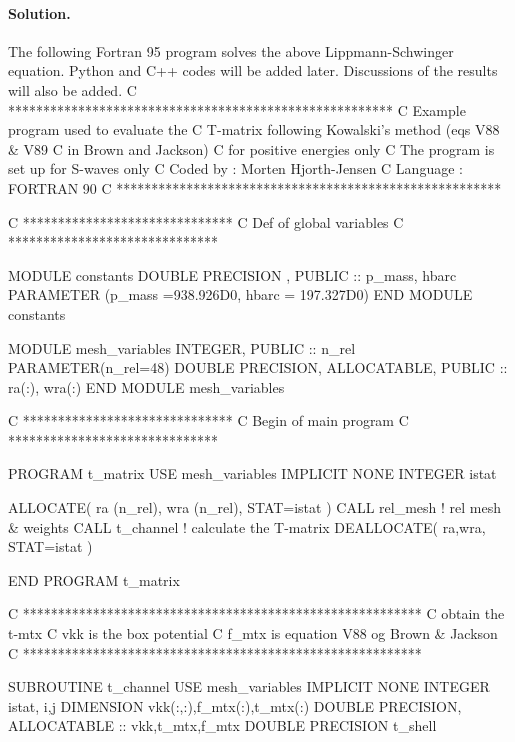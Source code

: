 \documentclass[%
oneside,                 %
final,                   %
10pt]{article}
\newenvironment{doconceexercise}{}{}
\begin{document}
\begin{doconceexercise}
\paragraph{Solution.}
The following Fortran 95 program solves the above Lippmann-Schwinger equation. Python and C++ codes will be added later. Discussions of the results will also be added.  
\bfcod
C     *******************************************************
C         Example program used to evaluate the 
C         T-matrix following Kowalski's method (eqs V88 & V89
C         in Brown and Jackson)  
C         for positive energies only
C         The program is set up for S-waves only
C         Coded by : Morten Hjorth-Jensen
C         Language : FORTRAN 90
C     *******************************************************



C               ******************************
C                 Def of global variables
C               ******************************


      MODULE constants
         DOUBLE PRECISION , PUBLIC :: p_mass, hbarc
         PARAMETER (p_mass =938.926D0, hbarc = 197.327D0)
      END MODULE constants

      MODULE mesh_variables           
         INTEGER, PUBLIC :: n_rel
         PARAMETER(n_rel=48)
         DOUBLE PRECISION, ALLOCATABLE, PUBLIC :: ra(:), wra(:)
      END MODULE  mesh_variables


C               ******************************
C                   Begin of main program
C               ******************************


      PROGRAM t_matrix
      USE mesh_variables
      IMPLICIT NONE
      INTEGER istat

      ALLOCATE( ra (n_rel), wra (n_rel),  STAT=istat )
      CALL rel_mesh               ! rel mesh & weights
      CALL t_channel              ! calculate the T-matrix
      DEALLOCATE( ra,wra, STAT=istat )

      END PROGRAM t_matrix

C     *********************************************************
C                    obtain the t-mtx
C                    vkk is the box potential
C                    f_mtx is equation V88 og Brown & Jackson
C     *********************************************************

      SUBROUTINE t_channel
      USE mesh_variables
      IMPLICIT NONE
      INTEGER istat, i,j
      DIMENSION vkk(:,:),f_mtx(:),t_mtx(:)
      DOUBLE PRECISION, ALLOCATABLE :: vkk,t_mtx,f_mtx
      DOUBLE PRECISION t_shell


\end{doconceexercise}
\end{document}
